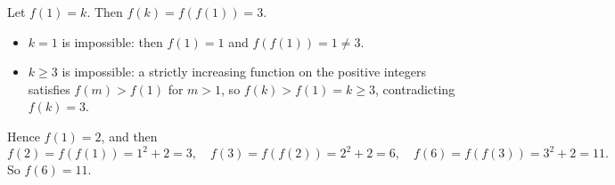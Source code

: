 Let $f(1)=k$. Then $f(k)=f(f(1))=3$.
\begin{itemize}
\item $k=1$ is impossible: then $f(1)=1$ and $f(f(1))=1\ne3$.
\item $k\ge3$ is impossible: a strictly increasing function on the positive integers satisfies $f(m)>f(1)$ for $m>1$, so $f(k)>f(1)=k\ge3$, contradicting $f(k)=3$.
\end{itemize}
Hence $f(1)=2$, and then
\[
f(2)=f(f(1))=1^2+2=3,\quad f(3)=f(f(2))=2^2+2=6,\quad f(6)=f(f(3))=3^2+2=11 .
\]
So $f(6)=\boxed{11}$.

